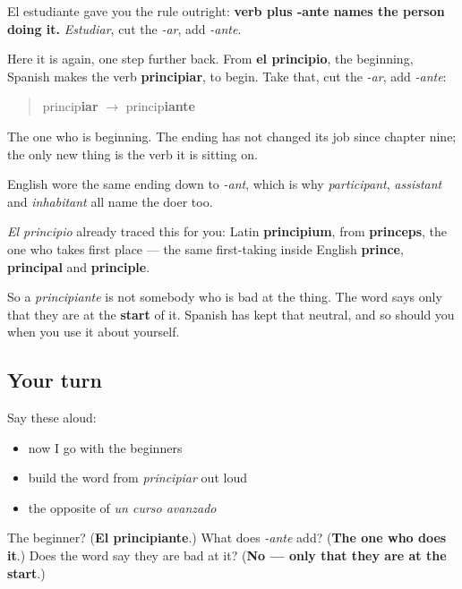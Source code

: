 \begin{grammarlens}[title={Grammar Lens: you could have built this one}]
El estudiante gave you the rule outright: \textbf{verb plus -ante names the person doing it.} \emph{Estudiar}, cut the \emph{-ar}, add \emph{-ante}.

Here it is again, one step further back. From \textbf{el principio}, the beginning, Spanish makes the verb \textbf{principiar}, to begin. Take that, cut the \emph{-ar}, add \emph{-ante}:

\begin{quote}
princip\textbf{iar} $\to$ princip\textbf{iante}
\end{quote}

The one who is beginning. The ending has not changed its job since chapter nine; the only new thing is the verb it is sitting on.

English wore the same ending down to \emph{-ant}, which is why \emph{participant}, \emph{assistant} and \emph{inhabitant} all name the doer too.
\end{grammarlens}

\begin{cousinweb}
\emph{El principio} already traced this for you: Latin \textbf{principium}, from \textbf{princeps}, the one who takes first place — the same first-taking inside English \textbf{prince}, \textbf{principal} and \textbf{principle}.

So a \emph{principiante} is not somebody who is bad at the thing. The word says only that they are at the \textbf{start} of it. Spanish has kept that neutral, and so should you when you use it about yourself.
\end{cousinweb}

\subsection*{Your turn}
Say these aloud:

\begin{itemize}
\raggedright
  \item now I go with the beginners
  \item build the word from \emph{principiar} out loud
  \item the opposite of \emph{un curso avanzado}
\end{itemize}

\begin{tcolorbox}[breakable,colback=teal!4,colframe=teal!35!black,title={Before you move on}]
The beginner? (\textbf{El principiante}.) What does \emph{-ante} add? (\textbf{The one who does it}.) Does the word say they are bad at it? (\textbf{No — only that they are at the start}.)
\end{tcolorbox}
